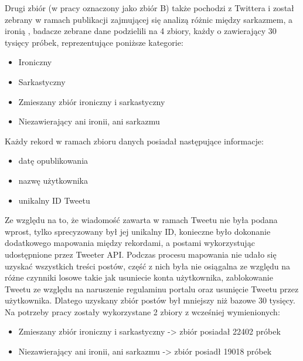 Drugi zbiór (w pracy oznaczony jako zbiór B) także pochodzi z Twittera i został zebrany w ramach publikacji zajmującej się analizą różnic między sarkazmem, a ironią  \cite{Ling2016}  , badacze zebrane dane podzielili na 4 zbiory, każdy o zawierający 30 tysięcy próbek,  reprezentujące poniższe kategorie:
\begin{itemize}
    \item Ironiczny
    \item Sarkastyczny
    \item Zmieszany zbiór ironiczny i sarkastyczny
    \item Niezawierający ani ironii, ani sarkazmu

\end{itemize}

Każdy rekord w ramach zbioru danych posiadał następujące informacje:
\begin{itemize}
    \item datę opublikowania
    \item nazwę użytkownika
    \item unikalny ID Tweetu
\end{itemize}




Ze względu na to, że wiadomość zawarta w ramach Tweetu nie była podana wprost, tylko sprecyzowany był jej unikalny ID, konieczne było dokonanie dodatkowego mapowania między rekordami, a postami wykorzystując udostępnione przez Tweeter API. Podczas procesu mapowania nie udało się uzyskać wszystkich treści postów, część z nich była nie osiągalna ze względu na różne czynniki losowe takie jak usuniecie konta użytkownika, zablokowanie Tweetu ze względu na naruszenie regulaminu portalu oraz usunięcie Tweetu przez użytkownika. Dlatego uzyskany zbiór postów był mniejszy niż bazowe 30 tysięcy.  
Na potrzeby pracy zostały wykorzystane 2 zbiory z wcześniej wymienionych:
\begin{itemize}
    \item Zmieszany zbiór ironiczny i sarkastyczny -> zbiór posiadał 22402 próbek
    \item Niezawierający ani ironii, ani sarkazmu -> zbiór posiadł 19018 próbek
\end{itemize}


